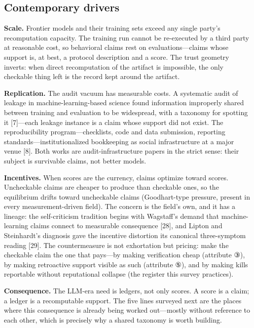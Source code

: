 \documentclass[11pt]{article}
\begin{document}
\subsection{Contemporary drivers}
\noindent \textbf{Scale.} Frontier models and their training sets exceed any single party's recomputation capacity. The training run cannot be re-executed by a third party at reasonable cost, so behavioral claims rest on evaluations—claims whose support is, at best, a protocol description and a score. The trust geometry inverts: when direct recomputation of the artifact is impossible, the only checkable thing left is the record kept around the artifact.\par
\noindent \textbf{Replication.} The audit vacuum has measurable costs. A systematic audit of leakage in machine-learning-based science found information improperly shared between training and evaluation to be widespread, with a taxonomy for spotting it [7]—each leakage instance is a claim whose support did not exist. The reproducibility program—checklists, code and data submission, reporting standards—institutionalized bookkeeping as social infrastructure at a major venue [8]. Both works are audit-infrastructure papers in the strict sense: their subject is survivable claims, not better models.\par
\noindent \textbf{Incentives.} When scores are the currency, claims optimize toward scores. Uncheckable claims are cheaper to produce than checkable ones, so the equilibrium drifts toward uncheckable claims (Goodhart-type pressure, present in every measurement-driven field). The concern is the field's own, and it has a lineage: the self-criticism tradition begins with Wagstaff's demand that machine-learning claims connect to measurable consequence [28], and Lipton and Steinhardt's diagnosis gave the incentive distortion its canonical three-symptom reading [29]. The countermeasure is not exhortation but pricing: make the checkable claim the one that pays—by making verification cheap (attribute ③), by making retroactive support visible as such (attribute ⑤), and by making kills reportable without reputational collapse (the register this survey practices).\par
\noindent \textbf{Consequence.} The LLM-era need is ledgers, not only scores. A score is a claim; a ledger is a recomputable support. The five lines surveyed next are the places where this consequence is already being worked out—mostly without reference to each other, which is precisely why a shared taxonomy is worth building.\par
\end{document}
